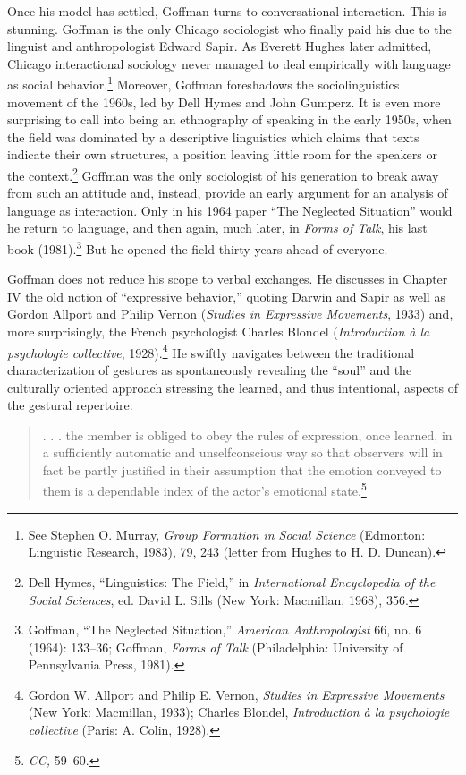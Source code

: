 \documentclass[openany,nobib]{tufte-book}
\begin{document}
Once his model has settled, Goffman turns to conversational interaction.
This is stunning. Goffman is the only Chicago sociologist who finally
paid his due to the linguist and anthropologist Edward Sapir. As Everett
Hughes later admitted, Chicago interactional sociology never managed to
deal empirically with language as social behavior.\footnote{See Stephen
  O. Murray, \emph{Group Formation in Social Science} (Edmonton:
  Linguistic Research, 1983), 79, 243 (letter from Hughes to H. D.
  Duncan).} Moreover, Goffman foreshadows the sociolinguistics movement
of the 1960s, led by Dell Hymes and John Gumperz. It is even more
surprising to call into being an ethnography of speaking in the early
1950s, when the field was dominated by a descriptive linguistics which
claims that texts indicate their own structures, a position leaving
little room for the speakers or the context.\footnote{Dell Hymes,
  ``Linguistics: The Field,'' in \emph{International Encyclopedia of the
  Social Sciences}, ed. David L. Sills (New York: Macmillan, 1968), 356.}
Goffman was the only sociologist of his generation to break away from
such an attitude and, instead, provide an early argument for an analysis
of language as interaction. Only in his 1964 paper ``The Neglected
Situation'' would he return to language, and then again, much later, in
\emph{Forms of Talk}, his last book (1981).\footnote{Goffman, ``The
  Neglected Situation,'' \emph{American Anthropologist} 66, no. 6
  (1964): 133--36; Goffman, \emph{Forms of Talk} (Philadelphia:
  University of Pennsylvania Press, 1981).} But he opened the field
thirty years ahead of everyone.

Goffman does not reduce his scope to verbal exchanges. He discusses in
Chapter IV the old notion of ``expressive behavior,'' quoting Darwin and
Sapir as well as Gordon Allport and Philip Vernon (\emph{Studies in
Expressive Movements}, 1933) and, more surprisingly, the French
psychologist Charles Blondel (\emph{Introduction à la psychologie
collective}, 1928).\footnote{Gordon W. Allport and Philip E. Vernon,
  \emph{Studies in Expressive Movements} (New York: Macmillan, 1933);
  Charles Blondel, \emph{Introduction à la psychologie collective}
  (Paris: A. Colin, 1928).} He swiftly navigates between the traditional
characterization of gestures as spontaneously revealing the ``soul'' and
the culturally oriented approach stressing the learned, and thus
intentional, aspects of the gestural repertoire:

\begin{quote}
. . . the member is obliged to obey the rules of expression, once
learned, in a sufficiently automatic and unselfconscious way so that
observers will in fact be partly justified in their assumption that the
emotion conveyed to them is a dependable index of the actor's emotional
state.\footnote{\emph{CC,} 59--60.}
\end{quote}
\end{document}
